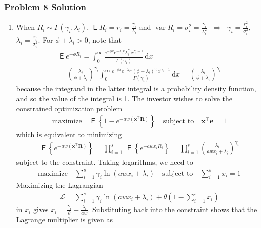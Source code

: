\documentclass[10pt,handout]{beamer}
\newcommand{\ds}{\displaystyle}
\newcommand{\ie}{\;\Longrightarrow\;}
\DeclareMathOperator\expc{\mathsf{E}}
\DeclareMathOperator\var{var}
\theoremstyle{definition}
\begin{document}
\begin{frame}[allowframebreaks]
  \frametitle{Problem 8 Solution}
  \begin{enumerate}
    \item When $R_i\sim\Gamma(\gamma_i, \lambda_i)$, $\ds\expc{R_i} = r_i = \frac{\gamma_i}{\lambda_i}$ and $\ds\var{R_i} = \sigma_i^2 = \frac{\gamma_i}{\lambda_i^2}$ $\ie$ $\ds\gamma_i = \frac{r_i^2}{\sigma_i^2}$, $\ds\lambda_i = \frac{r_i}{\sigma_i^2}$. For $\phi + \lambda_i > 0$, note that
    \begin{multline*}
      \expc{e^{-\phi R_i}} = \int_0^\infty \frac{e^{-\phi x}e^{-\lambda_i x}\lambda_i^{\gamma_i}x^{\gamma_i-1}}{\Gamma(\gamma_i)}\,\text{d}x \\= \left(\frac{\lambda_i}{\phi + \lambda_i}\right)^{\gamma_i} \int_0^\infty \frac{e^{-\phi x}e^{-\lambda_i x}(\phi + \lambda_i)^{\gamma_i}x^{\gamma_i-1}}{\Gamma(\gamma_i)}\,\text{d}x = \left(\frac{\lambda_i}{\phi + \lambda_i}\right)^{\gamma_i}
    \end{multline*}
    because the integrand in the latter integral is a probability density function, and so the value of the integral is 1. The investor wishes to solve the constrained optimization problem
    \begin{align*}
      \text{maximize}\quad \expc\left\{1 - e^{-aw(\mathbf{x}^\top\mathbf{R})}\right\} \quad\text{subject to}\quad \mathbf{x}^\top\mathbf{e} = 1
    \end{align*}
    which is equivalent to minimizing
    \begin{align*}
      \expc\left\{e^{-aw(\mathbf{x}^\top\mathbf{R})}\right\} = \prod_{i=1}^s\,\expc\left\{e^{-awx_i R_i}\right\} = \prod_{i=1}^s \left(\frac{\lambda_i}{awx_i + \lambda_i}\right)^{\gamma_i}
    \end{align*}
    subject to the constraint. Taking logarithms, we need to
    \begin{align*}
      \text{maximize} \quad \sum_{i=1}^s \gamma_i \ln(awx_i + \lambda_i) \quad \text{subject to} \quad \sum_{i=1}^s x_i = 1
    \end{align*}
    Maximizing the Lagrangian
    \begin{align*}
      \mathcal{L} = \sum_{i=1}^s \gamma_i \ln(awx_i + \lambda_i) + \theta\left(1 - \sum_{i=1}^s x_i\right)
    \end{align*}
    in $x_i$ gives $\ds x_i = \frac{\gamma_i}{\theta} - \frac{\lambda_i}{aw}$. Substituting back into the constraint shows that the Lagrange multiplier is given as
    \begin{align*}

\end{align*}
\end{enumerate}
\end{frame}
\end{document}
